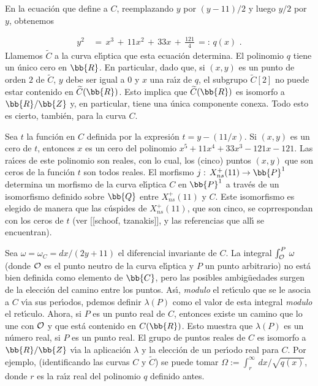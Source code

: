 En la ecuaci\'{o}n que define a $C$, reemplazando $y$ por
$(y-11)/2$ y luego $y/2$ por $y$, obtenemos

\begin{align*}
y^{2} & \,=\,x^{3}\,+\,11x^{2}\,+\,33x\,+\,\frac{121}{4}
\,=:\,q(x)\text{ .}
\end{align*}
Llamemos $\widetilde{C}$ a la curva el\'{\i}ptica que esta ecuaci\'{o}n
determina.
El polinomio $q$ tiene un \'{u}nico cero en $\bb{R}$. En particular,
dado que, si $(x,y)$ es un punto de orden $2$ de $\widetilde{C}$,
$y$ debe ser igual a $0$ y $x$ una ra\'{\i}z de $q$, el subgrupo
$\widetilde{C}[2]$ no puede estar contenido en $\widetilde{C}(\bb{R})$.
Esto implica que
$\widetilde{C}(\bb{R})$ es isomorfo a $\bb{R}/\bb{Z}$ y, en particular,
tiene una \'{u}nica componente conexa. Todo esto es cierto, tambi\'{e}n,
para la curva $C$.

Sea $t$ la funci\'{o}n en $C$ definida por la expresi\'{o}n
$t=y-(11/x)$. Si $(x,y)$ es un cero de $t$, entonces $x$ es un cero del
polinomio $x^{5}+11x^{4}+33x^{3}-121x-121$. Las ra\'{\i}ces de este
polinomio son reales, con lo cual, los (cinco) puntos $(x,y)$ que son
ceros de la funci\'{o}n $t$ son todos reales. El morfismo
$j:\,X_{ns}^{+}(11)\rightarrow\bb{P}^{1}$ determina un morfismo de la
curva el\'{\i}ptica $C$ en $\bb{P}^{1}$ a trav\'{e}s de un
isomorfismo definido sobre $\bb{Q}$ entre $X_{ns}^{+}(11)$ y $C$.
Este isomorfismo es elegido de manera que las c\'{u}spides de
$X_{ns}^{+}(11)$, que son cinco, se coprrespondan con los ceros de $t$
(ver [[schoof, tzanakis]], y las referencias que all\'{\i} se
encuentran).

Sea $\omega=\omega_{C}=dx/(2y+11)$ el diferencial invariante de $C$.
La integral $\int_{\cal{O}}^{P}\,\omega$ (donde $\cal{O}$ es el
punto neutro de la curva el\'{\i}ptica y $P$ un punto arbitrario)
no est\'{a} bien definida como elemento de $\bb{C}$, pero las
posibles ambig\"{u}edades surgen de la elecci\'{o}n del camino entre
los puntos. As\'{\i}, \textit{modulo} el ret\'{\i}culo que se le asocia
a $C$ v\'{\i}a sus per\'{\i}odos, pdemos definir $\lambda(P)$ como el
valor de esta integral \textit{modulo} el ret\'{\i}culo. Ahora, si
$P$ es un punto real de $C$, entonces existe un camino que lo une con
$\cal{O}$ y que est\'{a} contenido en $C(\bb{R})$. Esto muestra que
$\lambda(P)$ es un n\'{u}mero real, si $P$ es un punto real. El grupo
de puntos reales de $C$ es isomorfo a $\bb{R}/\bb{Z}$ v\'{\i}a la
aplicaci\'{o}n $\lambda$ y la elecci\'{o}n de un per\'{\i}odo real
para $C$. Por ejemplo, (identificando las curvas $C$ y $\widetilde{C}$)
se puede tomar
$\Omega:=\int_{r}^{\infty}\,dx/\sqrt{q(x)}$, donde $r$ es la
ra\'{\i}z real del polinomio $q$ definido antes. 

